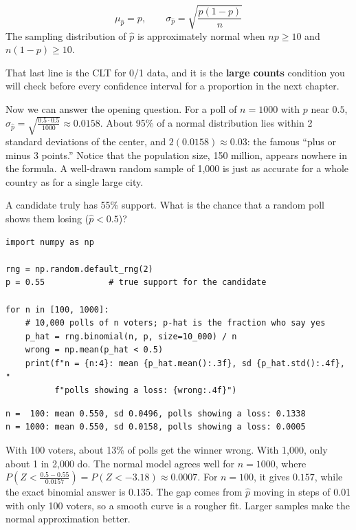 \begin{mdframed}[style = important, frametitle = {Mean and Standard Deviation of $\hat{p}$}]
$$\mu_{\hat{p}} = p, \qquad \sigma_{\hat{p}} = \sqrt{\frac{p(1-p)}{n}}$$
The sampling distribution of $\hat{p}$ is approximately normal when $np \geq 10$ and $n(1-p) \geq 10$.
\end{mdframed}

That last line is the CLT for 0/1 data, and it is the \textbf{large counts} condition you
will check before every confidence interval for a proportion in the next chapter.

Now we can answer the opening question. For a poll of $n = 1000$ with $p$ near $0.5$,
$\sigma_{\hat{p}} = \sqrt{\frac{0.5 \cdot 0.5}{1000}} \approx 0.0158$. About 95\% of a normal
distribution lies within 2 standard deviations of the center, and $2(0.0158) \approx 0.03$:
the famous ``plus or minus 3 points.'' Notice that the population size, 150 million, appears
nowhere in the formula. A well-drawn random sample of 1,000 is just as accurate for a whole
country as for a single large city.

\begin{Worked}
\begin{Problem}
A candidate truly has 55\% support. What is the chance that a random poll
shows them losing ($\hat{p} < 0.5$)?

\end{Problem}
\begin{Solution}
\begin{verbatim}
import numpy as np

rng = np.random.default_rng(2)
p = 0.55             # true support for the candidate

for n in [100, 1000]:
    # 10,000 polls of n voters; p-hat is the fraction who say yes
    p_hat = rng.binomial(n, p, size=10_000) / n
    wrong = np.mean(p_hat < 0.5)
    print(f"n = {n:4}: mean {p_hat.mean():.3f}, sd {p_hat.std():.4f}, "
          f"polls showing a loss: {wrong:.4f}")
\end{verbatim}
\begin{verbatim}
n =  100: mean 0.550, sd 0.0496, polls showing a loss: 0.1338
n = 1000: mean 0.550, sd 0.0158, polls showing a loss: 0.0005
\end{verbatim}
With 100 voters, about 13\% of polls get the winner wrong. With 1,000, only about 1 in
2,000 do. The normal model agrees well for $n = 1000$, where
$P\left(Z < \frac{0.5 - 0.55}{0.0157}\right) = P(Z < -3.18) \approx 0.0007$. For $n = 100$, it
gives $0.157$, while the exact binomial answer is $0.135$. The gap comes from $\hat{p}$
moving in steps of 0.01 with only 100 voters, so a smooth curve is a rougher fit. Larger
samples make the normal approximation better.
\end{Solution}
\end{Worked}

